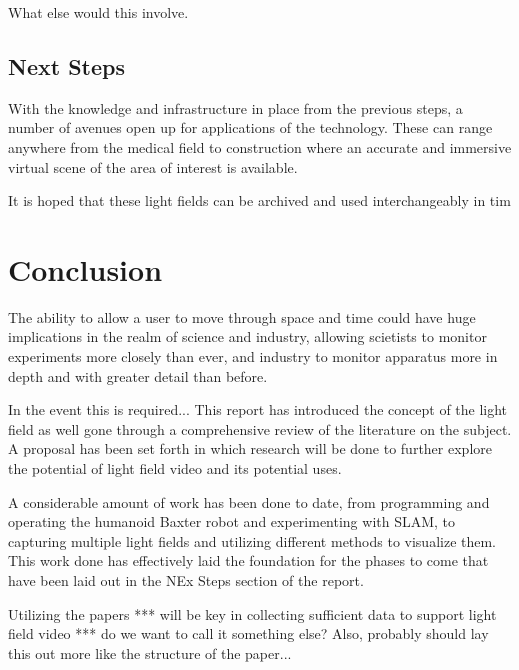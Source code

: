 \documentclass[12pt]{report}
\begin{document}
What else would this involve.

\section{Next Steps}

With the knowledge and infrastructure in place from the previous steps, a number of avenues open up for applications of the technology. These can range anywhere from the medical field to construction where an accurate and immersive virtual scene of the area of interest is available.

It is hoped that these light fields can be archived and used interchangeably in tim

\chapter{Conclusion}

The ability to allow a user to move through space and time could have huge implications in the realm of science and industry, allowing scietists to monitor experiments more closely than ever, and industry to monitor apparatus more in depth and with greater detail than before.

In the event this is required...
This report has introduced the concept of the light field as well gone through a comprehensive review of the literature on the subject. A proposal has been set forth in which research will be done to further explore the potential of light field video and its potential uses. 

A considerable amount of work has been done to date, from programming and operating the humanoid Baxter robot and experimenting with SLAM, to capturing multiple light fields and utilizing different methods to visualize them. This work done has effectively laid the foundation for the phases to come that have been laid out in the NEx Steps section of the report.

Utilizing the papers *** will be key in collecting sufficient data to support light field video *** do we want to call it something else? Also, probably should lay this out more like the structure of the paper...
\end{document}
